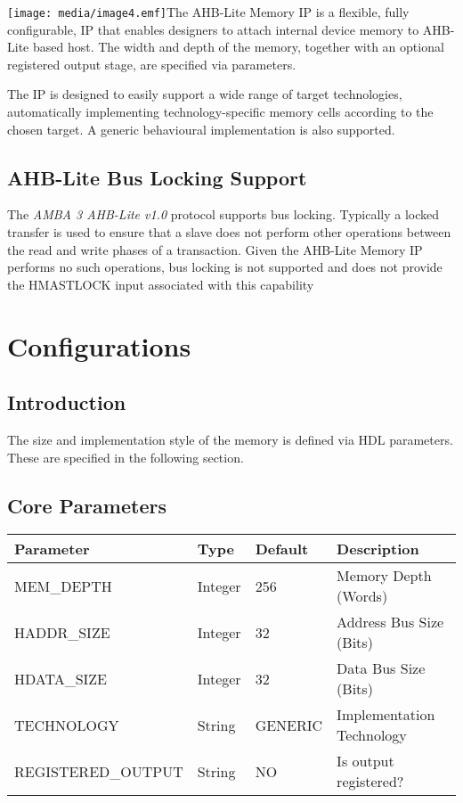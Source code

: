 \protect\hypertarget{_Toc326677726}{}{\protect\hypertarget{_Ref285296883}{}{\protect\hypertarget{_Ref285296868}{}{\protect\hypertarget{_Ref285296852}{}{\protect\hypertarget{_Ref285296837}{}{\protect\hypertarget{_Ref285296804}{}{}}}}}}\texttt{[image: media/image4.emf]}The
AHB-Lite Memory IP is a flexible, fully configurable, IP that enables
designers to attach internal device memory to AHB-Lite based host. The
width and depth of the memory, together with an optional registered
output stage, are specified via parameters.

The IP is designed to easily support a wide range of target
technologies, automatically implementing technology-specific memory
cells according to the chosen target. A generic behavioural
implementation is also supported.

\subsection{AHB-Lite Bus Locking
Support}\label{ahb-lite-bus-locking-support}

The \emph{AMBA 3 AHB-Lite v1.0} protocol supports bus locking. Typically
a locked transfer is used to ensure that a slave does not perform other
operations between the read and write phases of a transaction. Given the
AHB-Lite Memory IP performs no such operations, bus locking is not
supported and does not provide the HMASTLOCK input associated with this
capability

\section{Configurations}\label{configurations}

\subsection{Introduction}\label{introduction-1}

\protect\hypertarget{_Toc346441248}{}{}The size and implementation style
of the memory is defined via HDL parameters. These are specified in the
following section.

\subsection{Core Parameters}\label{core-parameters}

\begin{longtable}[]{@{}llll@{}}
\toprule
Parameter & Type & Default & Description\tabularnewline
\midrule
\endhead
MEM\_DEPTH & Integer & 256 & Memory Depth (Words)\tabularnewline
HADDR\_SIZE & Integer & 32 & Address Bus Size (Bits)\tabularnewline
HDATA\_SIZE & Integer & 32 & Data Bus Size (Bits)\tabularnewline
TECHNOLOGY & String & GENERIC & Implementation Technology\tabularnewline
REGISTERED\_OUTPUT & String & NO & Is output registered?\tabularnewline
\bottomrule
\end{longtable}

